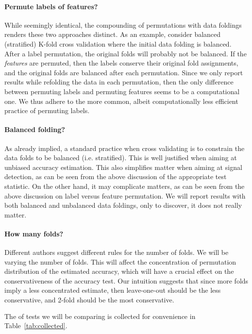 \documentclass[12pt,a4paper]{article}
\begin{document}
\paragraph{Permute labels of features?}
While seemingly identical, the compounding of permutations with data foldings renders these two approaches distinct. 
As an example, consider balanced (stratified) K-fold cross validation where the initial data folding is balanced. 
After a label permutation, the original folds will probably not be balanced. 
If the \emph{features} are permuted, then the labels conserve their original fold assignments, and the original folds are balanced after each permutation. 
Since we only report results while refolding the data in each permutation, then the only difference between permuting labels and permuting features seems to be a computational one. 
We thus adhere to the more common, albeit computationally less efficient practice of permuting labels. 


\paragraph{Balanced folding?}
As already implied, a standard practice when cross validating is to constrain the data folds to be balanced (i.e. stratified).
This is well justified when aiming at unbiased accuracy estimation. 
This also simplifies matter when aiming at signal detection, as can be seen from the above discussion of the appropriate test statistic. 
On the other hand, it may complicate matters, as can be seen from the above discussion on label versus feature permutation. 
We will report results with both balanced and unbalanced data foldings, only to discover, it does not really matter. 


\paragraph{How many folds?}
Different authors suggest different rules for the number of folds. 
We will be varying the number of folds.
This will affect the concentration of permutation distribution of the estimated accuracy, which will have a crucial effect on the conservativeness of the accuracy test. 
Our intuition suggests that since more folds imply a less concentrated estimate, then leave-one-out should be the less conservative, and 2-fold should be the most conservative. 


The of tests we will be comparing is collected for convenience in Table~\ref{tab:collected}.
\end{document}
